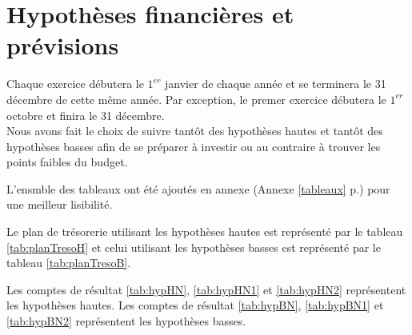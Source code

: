 	  \chapter{Hypoth\`eses financi\`eres et pr\'evisions}
		Chaque exercice d\'ebutera le $1^{er}$ janvier de chaque ann\'ee et se terminera le 31 d\'ecembre de cette même ann\'ee.
		Par exception, le premer exercice d\'ebutera le $1^{er}$ octobre et finira le 31 d\'ecembre.\\

		Nous avons fait le choix de suivre tantôt des hypoth\`eses hautes et tantôt des
		hypoth\`eses basses afin de se pr\'eparer à investir ou au contraire à trouver
		les points faibles du budget.

		L'ensmble des tableaux ont été ajoutés en annexe (Annexe \ref{tableaux} p.\pageref{tableaux}) pour une meilleur lisibilité.

		Le plan de tr\'esorerie utilisant les hypoth\`eses hautes est repr\'esent\'e par le tableau
		\ref{tab:planTresoH} et celui utilisant les hypoth\`eses basses est repr\'esent\'e par le tableau
		\ref{tab:planTresoB}.
		
		Les comptes de r\'esultat \ref{tab:hypHN},
		\ref{tab:hypHN1} et \ref{tab:hypHN2} repr\'esentent les hypoth\`eses hautes. Les
		comptes de r\'esultat \ref{tab:hypBN}, \ref{tab:hypBN1} et \ref{tab:hypBN2} repr\'esentent
		les hypoth\`eses basses.
